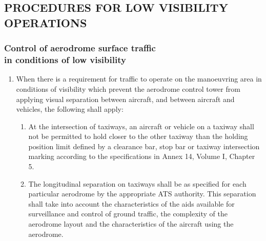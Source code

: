 \subsection[Procedures for low visibility operations]{PROCEDURES FOR LOW VISIBILITY OPERATIONS}

\subsubsection[Control of aerodrome surface traffic in conditions of low visibility]{Control of aerodrome surface traffic \\ in conditions of low visibility}

\begin{enumempty}[labelindent=\parindent]
    \item {}
\end{enumempty}

\begin{enumerate}
    \item When there is a requirement for traffic to operate on the manoeuvring area in conditions of visibility which prevent the aerodrome control tower from applying visual separation between aircraft, and between aircraft and vehicles, the following shall apply:

    \begin{enumerate}
        \item At the intersection of taxiways, an aircraft or vehicle on a taxiway shall not be permitted to hold closer to the other taxiway than the holding position limit defined by a clearance bar, stop bar or taxiway intersection marking according to the specifications in Annex 14, Volume I, Chapter 5.
        \item The longitudinal separation on taxiways shall be as specified for each particular aerodrome by the appropriate ATS authority. This separation shall take into account the characteristics of the aids available for surveillance and control of ground traffic, the complexity of the aerodrome layout and the characteristics of the aircraft using the aerodrome.
    \end{enumerate}

\end{enumerate}

